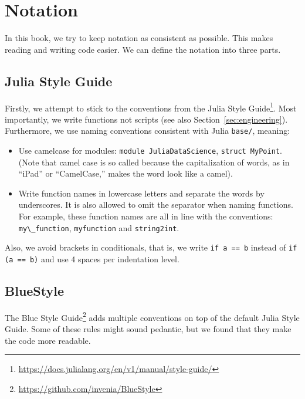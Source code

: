 \documentclass[
  notoc %
]{tufte-book}
\DeclareRobustCommand{\href}[2]{#2\footnote{\url{#1}}}
\providecommand{\tightlist}{%
  \setlength{\itemsep}{0pt}\setlength{\parskip}{0pt}
}
\newcommand{\passthrough}[1]{#1}
\begin{document}
\hypertarget{sec:notation}{%
\section{Notation}\label{sec:notation}}

In this book, we try to keep notation as consistent as possible. This
makes reading and writing code easier. We can define the notation into
three parts.

\hypertarget{julia-style-guide}{%
\subsection{Julia Style Guide}\label{julia-style-guide}}

Firstly, we attempt to stick to the conventions from the
\href{https://docs.julialang.org/en/v1/manual/style-guide/}{Julia Style
Guide}. Most importantly, we write functions not scripts (see also
Section~\ref{sec:engineering}). Furthermore, we use naming conventions
consistent with Julia \passthrough{\lstinline!base/!}, meaning:

\begin{itemize}
\tightlist
\item
  Use camelcase for modules:
  \passthrough{\lstinline!module JuliaDataScience!},
  \passthrough{\lstinline!struct MyPoint!}. (Note that camel case is so
  called because the capitalization of words, as in ``iPad'' or
  ``CamelCase,'' makes the word look like a camel).
\item
  Write function names in lowercase letters and separate the words by
  underscores. It is also allowed to omit the separator when naming
  functions. For example, these function names are all in line with the
  conventions: \passthrough{\lstinline!my\_function!},
  \passthrough{\lstinline!myfunction!} and
  \passthrough{\lstinline!string2int!}.
\end{itemize}

Also, we avoid brackets in conditionals, that is, we write
\passthrough{\lstinline!if a == b!} instead of
\passthrough{\lstinline!if (a == b)!} and use 4 spaces per indentation
level.

\hypertarget{bluestyle}{%
\subsection{BlueStyle}\label{bluestyle}}

The \href{https://github.com/invenia/BlueStyle}{Blue Style Guide} adds
multiple conventions on top of the default Julia Style Guide. Some of
these rules might sound pedantic, but we found that they make the code
more readable.
\end{document}
